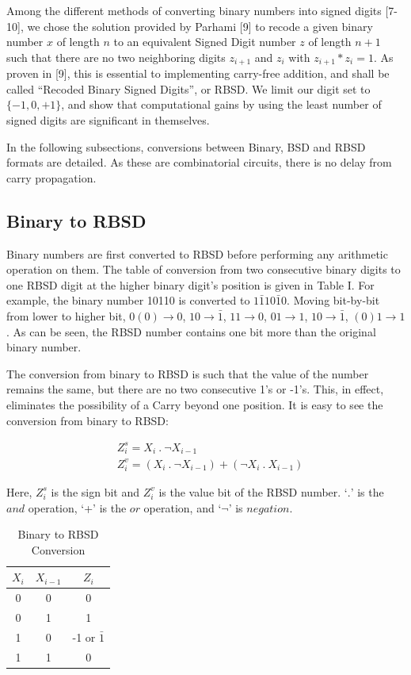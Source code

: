 \documentclass[conference]{IEEEtran_NCC}
\begin{document}
Among the different methods of converting binary numbers into signed digits [7-10], we chose  the solution provided by Parhami [9] to recode a given binary number $x$ of length $n$ to an equivalent Signed Digit number $z$ of length $n+1$ such that there are no two neighboring digits $z_{i+1}$ and $z_{i}$ with $z_{i+1} * z_{i} = 1$. As proven in [9], this is essential to implementing carry-free addition, and shall be called ``Recoded Binary Signed Digits'', or RBSD. We limit our digit set to $\{-1, 0, +1\}$, and show that computational gains by using the least number of signed digits are significant in themselves.

In the following subsections, conversions between Binary, BSD and RBSD formats are detailed. As these are combinatorial circuits, there is no delay from carry propagation.

\subsection{Binary to RBSD}

Binary numbers are first converted to RBSD before performing any arithmetic operation on them. The table of conversion from two consecutive binary digits to one RBSD digit at the higher binary digit’s position is given in Table I. For example, the binary number 10110 is converted to $1\bar{1}10\bar{1}0$. Moving bit-by-bit from lower to higher bit, $0(0) \to 0$, $10 \to \bar{1}$, $11 \to 0$, $01 \to 1$, $10 \to \bar{1}$, $(0)1 \to 1$. As can be seen, the RBSD number contains one bit more than the original binary number.

The conversion from binary to RBSD is such that the value of the number remains the same, but there are no two consecutive 1’s or -1’s. This, in effect, eliminates the possibility of a Carry beyond one position. It is easy to see the conversion from binary to RBSD:

\vspace{-1em}
\begin{align}
&Z_{i}^{s} = X_{i} \ . \ \neg X_{i-1} \\
&Z_{i}^{v} = (X_{i} \ . \ \neg X_{i-1}) + (\neg X_{i} \ . \ X_{i-1})
\end{align}

Here, $Z_{i}^{s}$ is the sign bit and $Z_{i}^{v}$  is the value bit of the RBSD number. `$.$' is the $and$ operation, `+' is the $or$ operation, and `$\neg$' is $negation$.

\vspace{-.5em}
\begin{table}[h!]
  \centering
  \caption{Binary to RBSD Conversion}
  \label{tab:table1}
  \begin{tabular}{|c|c||c|}
    \hline
    $X_{i}$ & $X_{i-1}$ & $Z_{i}$ \\
    \hline
    \hline
    0 & 0 & 0\\
    \hline
    0 & 1 & 1\\
    \hline
    1 & 0 & -1 or $\bar{1}$\\
    \hline
    1 & 1 & 0\\
    \hline
  \end{tabular}
\end{table}
\end{document}
